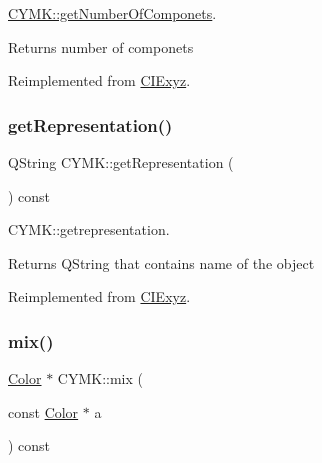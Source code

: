 \hyperlink{class_c_y_m_k_ab3f005a1cc28f715192ad4fc90ded6b8}{C\+Y\+M\+K\+::get\+Number\+Of\+Componets}. 

\begin{DoxyReturn}{Returns}
number of componets 
\end{DoxyReturn}


Reimplemented from \hyperlink{class_c_i_exyz_af168733bb1bca36a7ae5d75c67de046e}{C\+I\+Exyz}.

\mbox{\label{class_c_y_m_k_aa523f734fd52f67ca9fcb31f0b7fe579}} 
\subsubsection{\texorpdfstring{get\+Representation()}{getRepresentation()}}
{\footnotesize\ttfamily Q\+String C\+Y\+M\+K\+::get\+Representation (\begin{DoxyParamCaption}{ }\end{DoxyParamCaption}) const\hspace{0.3cm}{\ttfamily [virtual]}}



C\+Y\+M\+K\+::getrepresentation. 

\begin{DoxyReturn}{Returns}
Q\+String that contains name of the object 
\end{DoxyReturn}


Reimplemented from \hyperlink{class_c_i_exyz_a19120c15d1304696909d76fae6065ebd}{C\+I\+Exyz}.

\mbox{\label{class_c_y_m_k_adeb4691eafbb53e15538a3d829f59a14}} 
\subsubsection{\texorpdfstring{mix()}{mix()}}
{\footnotesize\ttfamily \hyperlink{class_color}{Color} $\ast$ C\+Y\+M\+K\+::mix (\begin{DoxyParamCaption}\item[{const \hyperlink{class_color}{Color} $\ast$}]{a }\end{DoxyParamCaption}) const\hspace{0.3cm}{\ttfamily [virtual]}}




